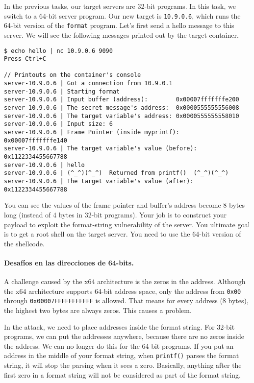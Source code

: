 In the previous tasks, our target servers are 32-bit
programs. In this task, we switch to a 64-bit server
program.  Our new target is \texttt{10.9.0.6}, which
runs the 64-bit version of the \texttt{format} program.
Let's first send a hello message to this server.
We will see the following messages printed out by the target container.


\begin{lstlisting}
$ echo hello | nc 10.9.0.6 9090
Press Ctrl+C

// Printouts on the container's console
server-10.9.0.6 | Got a connection from 10.9.0.1
server-10.9.0.6 | Starting format
server-10.9.0.6 | Input buffer (address):        0x00007fffffffe200
server-10.9.0.6 | The secret message's address:  0x0000555555556008
server-10.9.0.6 | The target variable's address: 0x0000555555558010
server-10.9.0.6 | Input size: 6
server-10.9.0.6 | Frame Pointer (inside myprintf):      0x00007fffffffe140
server-10.9.0.6 | The target variable's value (before): 0x1122334455667788
server-10.9.0.6 | hello
server-10.9.0.6 | (^_^)(^_^)  Returned from printf()  (^_^)(^_^)
server-10.9.0.6 | The target variable's value (after):  0x1122334455667788
\end{lstlisting}
 

You can see the values of the frame pointer and buffer's address
become 8 bytes long (instead of 4 bytes in 32-bit programs).
Your job is to construct your payload to exploit the format-string 
vulnerability of the server.
You ultimate goal is to get a root shell on
the target server. You need to use the 64-bit version of the shellcode.


\paragraph{Desafíos en las direcciones de 64-bits.}
A challenge caused by the x64 architecture is the zeros in the address.
Although the x64 architecture
supports 64-bit address space, only the address from
\texttt{0x00} through \texttt{0x00007FFFFFFFFFFF} is allowed. That means for
every address (8 bytes), the highest two bytes are always zeros.
This causes a problem.

In the attack, we need to place addresses inside the format string. For
32-bit programs, we can put the addresses anywhere, because there
are no zeros inside the address. We can no longer do this
for the 64-bit programs. If you put an address in the middle of
your format string, when \texttt{printf()} parses the
format string, it will stop the parsing when it sees a zero. Basically,
anything after the first zero in a format string will not
be considered as part of the format string.

